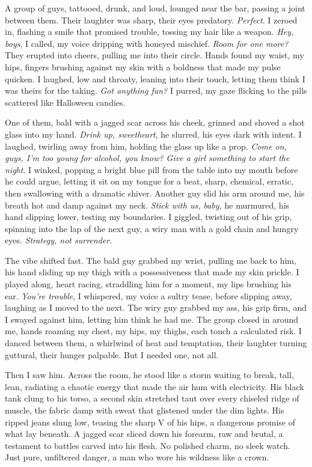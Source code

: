 \documentclass[12pt,oneside]{book}
\begin{document}
A group of guys, tattooed, drunk, and loud, lounged near the bar, passing a joint between them. Their laughter was sharp, their eyes predatory. \textit{Perfect}. I zeroed in, flashing a smile that promised trouble, tossing my hair like a weapon. \textit{Hey, boys}, I called, my voice dripping with honeyed mischief. \textit{Room for one more?} They erupted into cheers, pulling me into their circle. Hands found my waist, my hips, fingers brushing against my skin with a boldness that made my pulse quicken. I laughed, low and throaty, leaning into their touch, letting them think I was theirs for the taking. \textit{Got anything fun?} I purred, my gaze flicking to the pills scattered like Halloween candies.

One of them, bald with a jagged scar across his cheek, grinned and shoved a shot glass into my hand. \textit{Drink up, sweetheart}, he slurred, his eyes dark with intent. I laughed, twirling away from him, holding the glass up like a prop. \textit{Come on, guys, I’m too young for alcohol, you know? Give a girl something to start the night}. I winked, popping a bright blue pill from the table into my mouth before he could argue, letting it sit on my tongue for a beat, sharp, chemical, erratic, then swallowing with a dramatic shiver. Another guy slid his arm around me, his breath hot and damp against my neck. \textit{Stick with us, baby,} he murmured, his hand slipping lower, testing my boundaries. I giggled, twisting out of his grip, spinning into the lap of the next guy, a wiry man with a gold chain and hungry eyes. \textit{Strategy, not surrender.}

The vibe shifted fast. The bald guy grabbed my wrist, pulling me back to him, his hand sliding up my thigh with a possessiveness that made my skin prickle. I played along, heart racing, straddling him for a moment, my lips brushing his ear. \textit{You’re trouble}, I whispered, my voice a sultry tease, before slipping away, laughing as I moved to the next. The wiry guy grabbed my ass, his grip firm, and I swayed against him, letting him think he had me. The group closed in around me, hands roaming my chest, my hips, my thighs, each touch a calculated risk. I danced between them, a whirlwind of heat and temptation, their laughter turning guttural, their hunger palpable. But I needed one, not all.

Then I saw him. Across the room, he stood like a storm waiting to break, tall, lean, radiating a chaotic energy that made the air hum with electricity. His black tank clung to his torso, a second skin stretched taut over every chiseled ridge of muscle, the fabric damp with sweat that glistened under the dim lights. His ripped jeans slung low, teasing the sharp V of his hips, a dangerous promise of what lay beneath. A jagged scar sliced down his forearm, raw and brutal, a testament to battles carved into his flesh. No polished charm, no sleek watch. Just pure, unfiltered danger, a man who wore his wildness like a crown.
\end{document}
